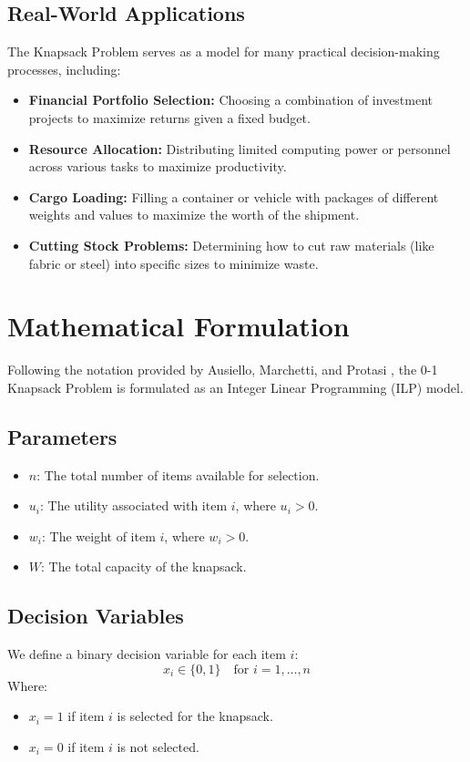 \documentclass[11pt,a4paper]{article}
\begin{document}
\subsection*{Real-World Applications}
The Knapsack Problem serves as a model for many practical decision-making processes, including:
\begin{itemize}
    \item \textbf{Financial Portfolio Selection:} Choosing a combination of investment projects to maximize returns given a fixed budget.
    \item \textbf{Resource Allocation:} Distributing limited computing power or personnel across various tasks to maximize productivity.
    \item \textbf{Cargo Loading:} Filling a container or vehicle with packages of different weights and values to maximize the worth of the shipment.
    \item \textbf{Cutting Stock Problems:} Determining how to cut raw materials (like fabric or steel) into specific sizes to minimize waste.
\end{itemize}

\section{Mathematical Formulation}

Following the notation provided by Ausiello, Marchetti, and Protasi \cite{AusielloProtasi}, the 0-1 Knapsack Problem is formulated as an Integer Linear Programming (ILP) model.

\subsection*{Parameters}
\begin{itemize}
    \item $n$: The total number of items available for selection.
    \item $u_i$: The utility associated with item $i$, where $u_i > 0$.
    \item $w_i$: The weight of item $i$, where $w_i > 0$.
    \item $W$: The total capacity of the knapsack.
\end{itemize}

\subsection*{Decision Variables}
We define a binary decision variable for each item $i$:
\begin{equation*}
    x_i \in \{0, 1\} \quad \text{for } i = 1, \dots, n
\end{equation*}
Where:
\begin{itemize}
    \item $x_i = 1$ if item $i$ is selected for the knapsack.
    \item $x_i = 0$ if item $i$ is not selected.
\end{itemize}
\end{document}
